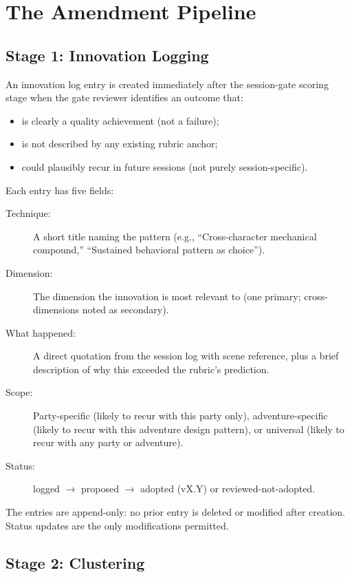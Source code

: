 
\section{The Amendment Pipeline}
\label{sec:pipeline}

\subsection{Stage 1: Innovation Logging}

An innovation log entry is created immediately after the session-gate scoring stage
when the gate reviewer identifies an outcome that:

\begin{itemize}
  \item is clearly a quality achievement (not a failure);
  \item is not described by any existing rubric anchor;
  \item could plausibly recur in future sessions (not purely session-specific).
\end{itemize}

Each entry has five fields:

\begin{description}
  \item[Technique:] A short title naming the pattern (e.g., ``Cross-character
    mechanical compound,'' ``Sustained behavioral pattern as choice'').
  \item[Dimension:] The dimension the innovation is most relevant to (one primary;
    cross-dimensions noted as secondary).
  \item[What happened:] A direct quotation from the session log with scene reference,
    plus a brief description of why this exceeded the rubric's prediction.
  \item[Scope:] Party-specific (likely to recur with this party only), adventure-specific
    (likely to recur with this adventure design pattern), or universal (likely to recur
    with any party or adventure).
  \item[Status:] logged $\to$ proposed $\to$ adopted (vX.Y) or reviewed-not-adopted.
\end{description}

The entries are append-only: no prior entry is deleted or modified after creation.
Status updates are the only modifications permitted.

\subsection{Stage 2: Clustering}

